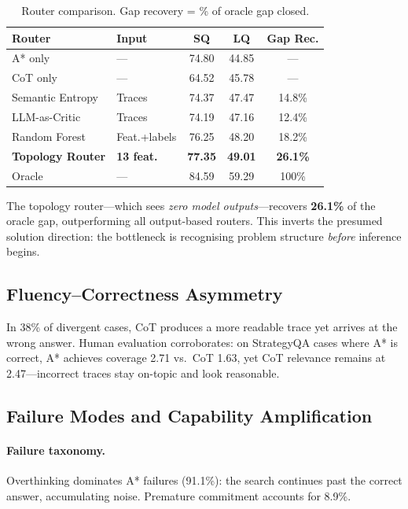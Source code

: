 \documentclass[11pt]{article}
\begin{document}
\begin{table}[t]
\centering
\caption{Router comparison.  Gap recovery = \% of oracle gap closed.}
\label{tab:router}
\small
\begin{tabular}{@{}llccc@{}}
\toprule
\textbf{Router} & \textbf{Input} & \textbf{SQ} & \textbf{LQ}
  & \textbf{Gap Rec.} \\
\midrule
A* only         & ---              & 74.80 & 44.85 & --- \\
CoT only        & ---              & 64.52 & 45.78 & --- \\
\midrule
Semantic Entropy   & Traces           & 74.37 & 47.47 & 14.8\% \\
LLM-as-Critic      & Traces           & 74.19 & 47.16 & 12.4\% \\
Random Forest      & Feat.+labels     & 76.25 & 48.20 & 18.2\% \\
\textbf{Topology Router} & \textbf{13 feat.} & \textbf{77.35}
  & \textbf{49.01} & \textbf{26.1\%} \\
\midrule
Oracle & --- & 84.59 & 59.29 & 100\% \\
\bottomrule
\end{tabular}
\end{table}

The topology router---which sees \emph{zero model outputs}---recovers
\textbf{26.1\%} of the oracle gap, outperforming all output-based routers.
This inverts the presumed solution direction: the bottleneck is recognising
problem structure \emph{before} inference begins.

\subsection{Fluency--Correctness Asymmetry}
\label{sec:fluency}

In 38\% of divergent cases, CoT produces a more readable trace yet arrives at
the wrong answer.  Human evaluation corroborates: on StrategyQA cases where A*
is correct, A* achieves coverage 2.71 vs.\ CoT 1.63, yet CoT relevance
remains at 2.47---incorrect traces stay on-topic and look reasonable.

\subsection{Failure Modes and Capability Amplification}
\label{sec:failure}

\paragraph{Failure taxonomy.}
Overthinking dominates A* failures (91.1\%): the search continues past the
correct answer, accumulating noise.  Premature commitment accounts for 8.9\%.
\end{document}
